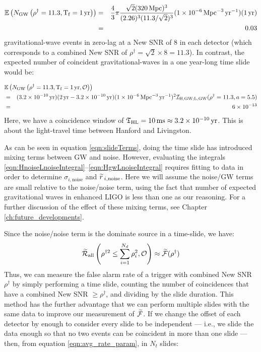 \begin{eqnarray}
\mathbb{E}\left( N_{\mathrm{GW}} \left( \rho^{\dagger}  =  11.3, \mathrm{T_f} = 1 \,\mathrm{yr} \right)\right) & = & \frac{4}{3} \pi \frac{\sqrt{2} (320\,\mathrm{Mpc})^3}{(2.26)^3 (11.3 / \sqrt{2})^3} (1 \times 10^{-6}\,\mathrm{Mpc}^{-3}\,\mathrm{yr^{-1}}) (1\,\mathrm{yr}) \nonumber \\
 & = & 0.03 \nonumber
\end{eqnarray}
gravitational-wave events in zero-lag at a New \ac{SNR} of $8$ in each detector (which corresponds to a combined New SNR of $\rho^\dagger = \sqrt{2} \times 8 = 11.3$). In contrast, the expected number of coincident gravitational-waves in a one year-long time slide would be:

\begin{eqnarray}
\lefteqn{\Exptd\left( N_{\mathrm{GW}} \left(\rho^{\dagger} = 11.3, \Tf = 1\,\mathrm{yr}, \mathcal{O} \right) \right) } \nonumber \\
& = & (3.2 \times 10^{-10}\yr) ( 2\yr - 3.2\times10^{-10}\yr ) (1\times10^{-6}\Mpc^{-3}\yr^{-1})^2 \mathcal{I}_{\mathrm{H,GW;L,GW}}(\rho^\dagger = 11.3, a = 5.5) \nonumber \\
& = & 6 \times 10^{-13} \nonumber
\end{eqnarray}
Here, we have a coincidence window of $\mathfrak{T}_{\mathrm{H}\mathrm{L}} = 10\,\mathrm{ms} \approx 3.2\times10^{-10}\,\mathrm{yr}$. This is about the light-travel time between Hanford and Livingston.

As can be seen in equation \ref{eqn:slideTerms}, doing the time slide has introduced mixing terms between \acs{GW} and noise. However, evaluating the integrals \ref{eqn:HnoiseLnoiseIntegral}--\ref{eqn:HgwLnoiseIntegral} requires fitting to data in order to determine $\sigma_{i,\mathrm{noise}}$ and $\widetilde{r}\,_{i,\mathrm{noise}}$. Here we will assume the noise/GW terms are small relative to the noise/noise term, using the fact that number of expected gravitational waves in enhanced \ac{LIGO} is less than one as our reasoning. For a further discussion of the effect of these mixing terms, see Chapter \ref{ch:future_developments}.

Since the noise/noise term is the dominate source in a time-slide, we have:
\begin{equation}
\label{eqn:valid_slide_condition}
\tR_{\mathrm{all}}\left(\rho^{\dagger2} \leq \sum_{i=1}^{N_d} \rho_i^2, \mathcal{O} \right) \approx \widetilde{\far}(\rho^\dagger)
\end{equation}
Thus, we can measure the false alarm rate of a trigger with combined New \ac{SNR} $\rho^\dagger$ by simply performing a time slide, counting the number of coincidences that have a combined New \ac{SNR} $\geq \rho^\dagger$, and dividing by the slide duration. This method has the further advantage that we can perform multiple slides with the same data to improve our measurement of $\widetilde{\mathcal{F}}$. If we change the offset of each detector by enough to consider every slide to be independent --- i.e., we slide the data enough so that no two events can be coincident in more than one slide ---  then, from equation \ref{eqn:avg_rate_param}, in $N_t$ slides:

